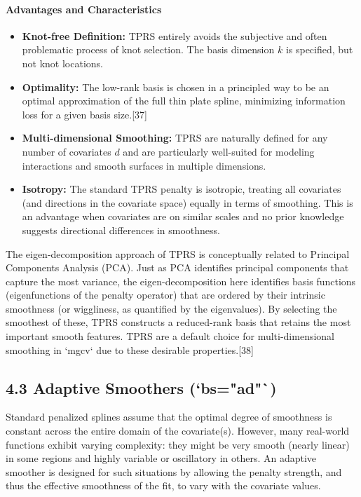 \documentclass[11pt, a4paper]{article}
\begin{document}
\begin{itemize}
\paragraph{Advantages and Characteristics}
\begin{itemize}
 \item \textbf{Knot-free Definition:} TPRS entirely avoids the subjective and often problematic process of knot selection. The basis dimension $k$ is specified, but not knot locations.
 \item \textbf{Optimality:} The low-rank basis is chosen in a principled way to be an optimal approximation of the full thin plate spline, minimizing information loss for a given basis size.[37]
 \item \textbf{Multi-dimensional Smoothing:} TPRS are naturally defined for any number of covariates $d$ and are particularly well-suited for modeling interactions and smooth surfaces in multiple dimensions.
 \item \textbf{Isotropy:} The standard TPRS penalty is isotropic, treating all covariates (and directions in the covariate space) equally in terms of smoothing. This is an advantage when covariates are on similar scales and no prior knowledge suggests directional differences in smoothness.
\end{itemize}
The eigen-decomposition approach of TPRS is conceptually related to Principal Components Analysis (PCA). Just as PCA identifies principal components that capture the most variance, the eigen-decomposition here identifies basis functions (eigenfunctions of the penalty operator) that are ordered by their intrinsic smoothness (or wiggliness, as quantified by the eigenvalues). By selecting the smoothest of these, TPRS constructs a reduced-rank basis that retains the most important smooth features. TPRS are a default choice for multi-dimensional smoothing in `mgcv` due to these desirable properties.[38]

\subsection{4.3 Adaptive Smoothers (`bs="ad"`)}
Standard penalized splines assume that the optimal degree of smoothness is constant across the entire domain of the covariate(s). However, many real-world functions exhibit varying complexity: they might be very smooth (nearly linear) in some regions and highly variable or oscillatory in others. An adaptive smoother is designed for such situations by allowing the penalty strength, and thus the effective smoothness of the fit, to vary with the covariate values.


\end{itemize}
\end{document}
